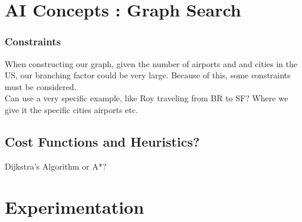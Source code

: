 \documentclass[11pt]{article}
\begin{document}
\section{AI Concepts : Graph Search}


\subsubsection{Constraints}
When constructing our graph, given the number of airports and and cities in the US, our branching factor could be very large. Because of this, some constraints must be considered. \\
Can use a very specific example, like Roy traveling from BR to SF? Where we give it the specific cities airports etc.

\subsection{Cost Functions and Heuristics?}
Dijkstra's Algorithm or A*?



\section{Experimentation}



				

\end{document}
